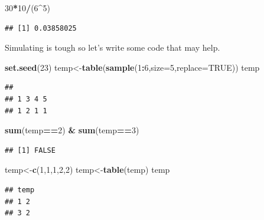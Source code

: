 \documentclass[
]{book}
\newenvironment{Shaded}{\begin{snugshade}}{\end{snugshade}}
\newcommand{\DataTypeTok}[1]{\textcolor[rgb]{0.13,0.29,0.53}{#1}}
\newcommand{\DecValTok}[1]{\textcolor[rgb]{0.00,0.00,0.81}{#1}}
\newcommand{\KeywordTok}[1]{\textcolor[rgb]{0.13,0.29,0.53}{\textbf{#1}}}
\newcommand{\NormalTok}[1]{#1}
\newcommand{\OperatorTok}[1]{\textcolor[rgb]{0.81,0.36,0.00}{\textbf{#1}}}
\newcommand{\OtherTok}[1]{\textcolor[rgb]{0.56,0.35,0.01}{#1}}
\newcommand{\StringTok}[1]{\textcolor[rgb]{0.31,0.60,0.02}{#1}}
\begin{document}
\begin{Shaded}
\begin{Highlighting}[]
\DecValTok{30}\OperatorTok{*}\DecValTok{10}\OperatorTok{/}\NormalTok{(}\DecValTok{6}\OperatorTok{^}\DecValTok{5}\NormalTok{)}
\end{Highlighting}
\end{Shaded}

\begin{verbatim}
## [1] 0.03858025
\end{verbatim}

Simulating is tough so let's write some code that may help.

\begin{Shaded}
\begin{Highlighting}[]
\KeywordTok{set.seed}\NormalTok{(}\DecValTok{23}\NormalTok{)}
\NormalTok{temp<-}\KeywordTok{table}\NormalTok{(}\KeywordTok{sample}\NormalTok{(}\DecValTok{1}\OperatorTok{:}\DecValTok{6}\NormalTok{,}\DataTypeTok{size=}\DecValTok{5}\NormalTok{,}\DataTypeTok{replace=}\OtherTok{TRUE}\NormalTok{))}
\NormalTok{temp}
\end{Highlighting}
\end{Shaded}

\begin{verbatim}
## 
## 1 3 4 5 
## 1 2 1 1
\end{verbatim}

\begin{Shaded}
\begin{Highlighting}[]
\KeywordTok{sum}\NormalTok{(temp}\OperatorTok{==}\DecValTok{2}\NormalTok{) }\OperatorTok{&}\StringTok{ }\KeywordTok{sum}\NormalTok{(temp}\OperatorTok{==}\DecValTok{3}\NormalTok{)}
\end{Highlighting}
\end{Shaded}

\begin{verbatim}
## [1] FALSE
\end{verbatim}

\begin{Shaded}
\begin{Highlighting}[]
\NormalTok{temp<-}\KeywordTok{c}\NormalTok{(}\DecValTok{1}\NormalTok{,}\DecValTok{1}\NormalTok{,}\DecValTok{1}\NormalTok{,}\DecValTok{2}\NormalTok{,}\DecValTok{2}\NormalTok{)}
\NormalTok{temp<-}\KeywordTok{table}\NormalTok{(temp)}
\NormalTok{temp}
\end{Highlighting}
\end{Shaded}

\begin{verbatim}
## temp
## 1 2 
## 3 2
\end{verbatim}
\end{document}
